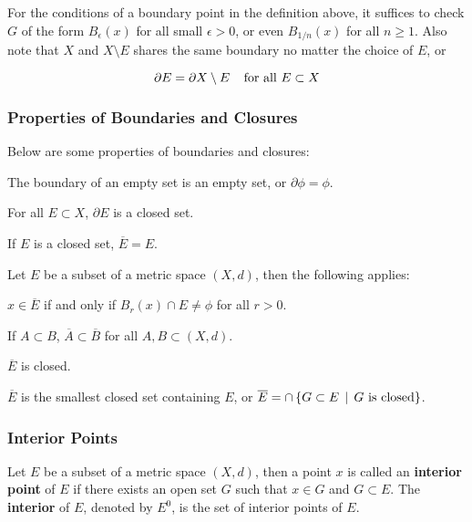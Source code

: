 \documentclass[a4paper,12pt]{article}
\begin{document}
For the conditions of a boundary point in the definition above, it suffices to check $G$ of the form $B_{\epsilon}(x)$ for all small $\epsilon>0$, or even $B_{1/n}(x)$ for all $n\geq 1$. Also note that $X$ and $X\setminus E$ shares the same boundary no matter the choice of $E$, or

$$\partial E=\partial X\setminus E\;\;\;\;\text{for all }E\subset X$$\s

\subsubsection{Properties of Boundaries and Closures}
\begin{pst}
  Below are some properties of boundaries and closures:

  \begin{alist}
    \item The boundary of an empty set is an empty set, or $\partial\phi=\phi$.
    \item For all $E\subset X$, $\partial E$ is a closed set.
    \item If $E$ is a closed set, $\overline{E}=E$.
  \end{alist}
\end{pst}\n

\begin{pst}
  Let $E$ be a subset of a metric space $(X,d)$, then the following applies:

  \begin{alist}
    \item $x\in\overline{E}$ if and only if $B_{r}(x)\cap E\neq\phi$ for all $r>0$.
    \item If $A\subset B$, $\overline{A}\subset\overline{B}$ for all $A,B\subset(X,d)$.
    \item $\overline{E}$ is closed.
    \item $\overline{E}$ is the smallest closed set containing $E$, or $\overline{E}=\cap\left\{ G\subset E\,\mid\, G\text{ is closed}\right\}$.
  \end{alist}
\end{pst}

\subsubsection{Interior Points}
\begin{dft}
  Let $E$ be a subset of a metric space $(X,d)$, then a point $x$ is called an \textbf{interior point} of $E$ if there exists an open set $G$ such that $x\in G$ and $G\subset E$. The \textbf{interior} of $E$, denoted by $E^{0}$, is the set of interior points of $E$.
\end{dft}\n
\end{document}
